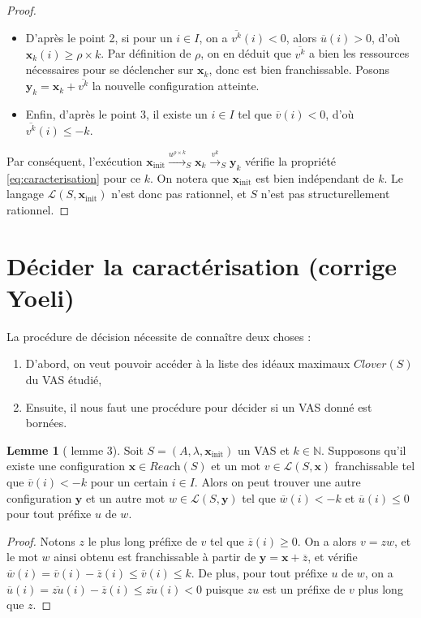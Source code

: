 \documentclass[a4paper,final]{article}
\theoremstyle{definition}
\newtheorem{Lemma}[Theorem]{Lemme}
\let\leq\leqslant
\let\geq\geqslant
\newcommand{\N}{\ensuremath{\mathbb{N}}}
\newcommand{\lang}{\ensuremath{\mathcal{L}}}
\newcommand{\reach}{\ensuremath{\textit{Reach}}}
\newcommand{\clover}{\textit{Clover}}
\newcommand{\trans}[2]{\ensuremath{\stackrel{#1}{\longrightarrow}_{#2}}}
\newcommand{\vect}[1]{\ensuremath{\mathbf{#1}}}
\newcommand{\xinit}{\ensuremath{\vect{x}_\text{init}}}
\newcommand{\valeur}[1]{\ensuremath{\overline{#1}}}
\begin{document}
\begin{proof}
\begin{itemize}
    \item D'après le point 2, si pour un $i\in I$, on a $\valeur{v^k}(i) < 0$, alors $\valeur{u}(i) > 0$, d'où $\vect{x}_k(i) \geq \rho\times k$.
    Par définition de $\rho$, on en déduit que $\valeur{v^k}$ a bien les ressources nécessaires pour se déclencher sur $\vect{x}_k$, donc est bien franchissable.
    Posons $\vect{y}_k = \vect{x}_k + \valeur{v^k}$ la nouvelle configuration atteinte.
    
    \item Enfin, d'après le point 3, il existe un $i\in I$ tel que $\valeur{v}(i) < 0$, d'où $\valeur{v^k}(i) \leq -k$.
\end{itemize}
Par conséquent, l'exécution $\xinit \trans{u^{\rho\times k}}{S} \vect{x}_k \trans{v^k}{S} \vect{y}_k$ vérifie la propriété \eqref{eq:caracterisation} pour ce $k$.
On notera que $\xinit$ est bien indépendant de $k$.
Le langage $\lang(S,\xinit)$ n'est donc pas rationnel, et $S$ n'est pas structurellement rationnel.
\end{proof}


\section{Décider la caractérisation (corrige Yoeli)}

La procédure de décision nécessite de connaître deux choses :
\begin{enumerate}
    \item D'abord, on veut pouvoir accéder à la liste des idéaux maximaux $\clover(S)$ du VAS étudié,
    \item Ensuite, il nous faut une procédure pour décider si un VAS donné est bornées.
\end{enumerate}

\begin{Lemma}[\cite{giyo80} lemme 3]\label{mot décroissant}
    Soit $S=(A,\lambda,\xinit)$ un VAS et $k\in\N$.
    Supposons qu'il existe une configuration $\vect{x}\in \reach(S)$ et un mot $v\in\lang(S,\vect{x})$ franchissable tel que $\valeur{v}(i) < -k$ pour un certain $i \in I$.
    Alors on peut trouver une autre configuration $\vect{y}$ et un autre mot $w\in\lang(S,\vect{y})$ tel que $\valeur{w}(i) < -k$ et $\valeur{u}(i) \leq 0$ pour tout préfixe $u$ de $w$.
\end{Lemma}

\begin{proof}
Notons $z$ le plus long préfixe de $v$ tel que $\valeur{z}(i) \geq 0$.
On a alors $v = zw$, et le mot $w$ ainsi obtenu est franchissable à partir de $\vect{y} = \vect{x} + \valeur{z}$, 
et vérifie $\valeur{w}(i) = \valeur{v}(i) - \valeur{z}(i) \leq \valeur{v}(i) \leq k$.
De plus, pour tout préfixe $u$ de $w$, on a $\valeur{u}(i) = \valeur{zu}(i) - \valeur{z}(i) \leq \valeur{zu}(i) < 0$ puisque $zu$ est un préfixe de $v$ plus long que $z$.
\end{proof}
\end{document}
